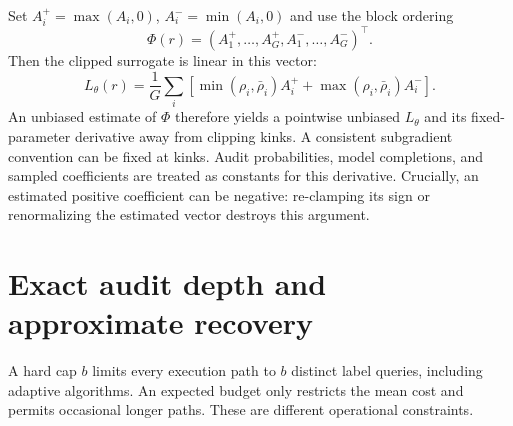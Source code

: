 \documentclass[11pt]{article}
\begin{document}
Set $A_i^+=\max(A_i,0)$, $A_i^-=\min(A_i,0)$ and use the block ordering
\begin{equation}\label{eq:phi}
 \Phi(r)=(A_1^+,\ldots,A_G^+,A_1^-,\ldots,A_G^-)^\top.
\end{equation}
Then the clipped surrogate is linear in this vector:
\begin{equation}\label{eq:cliplinear}
 L_\theta(r)=\frac1G\sum_i\left[
 \min(\rho_i,\bar\rho_i)A_i^+ +
 \max(\rho_i,\bar\rho_i)A_i^-\right].
\end{equation}
An unbiased estimate of $\Phi$ therefore yields a pointwise unbiased $L_\theta$ and its fixed-parameter derivative away from clipping kinks. A consistent subgradient convention can be fixed at kinks. Audit probabilities, model completions, and sampled coefficients are treated as constants for this derivative. Crucially, an estimated positive coefficient can be negative: re-clamping its sign or renormalizing the estimated vector destroys this argument.

\section{Exact audit depth and approximate recovery}\label{sec:degree}
A hard cap $b$ limits every execution path to $b$ distinct label queries, including adaptive algorithms. An expected budget only restricts the mean cost and permits occasional longer paths. These are different operational constraints.
\end{document}
